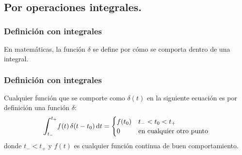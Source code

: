 \documentclass[12pt]{beamer}
\begin{document}
\subsection{Por operaciones integrales.}

\begin{frame}
\frametitle{Definición con integrales}
En matemáticas, la función $\delta$ se define por cómo se comporta dentro de una integral.
\end{frame}
\begin{frame}
    \frametitle{Definición con integrales}
Cualquier función que se comporte como $\delta (t)$ en la siguiente ecuación es por definición una función $\delta$:
\pause
\begin{align*}
\scaleint{6ex}_{\bs t_{-}}^{t_{+}} f(t) \, \delta(t - t_{0}) \dd{t} = \begin{cases}
f(t_{0}) & t_{-} < t_{0}  < t_{+} \\
0 & \mbox{en cualquier otro punto}
\end{cases}
\end{align*}
donde $t_{-} < t_{+}$ y $f (t)$ es cualquier función continua de buen comportamiento.
\end{frame}
\end{document}
